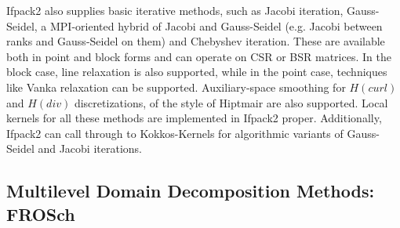 Ifpack2 also supplies basic iterative methods, such as Jacobi
iteration, Gauss-Seidel, a MPI-oriented hybrid of Jacobi and
Gauss-Seidel (e.g. Jacobi between ranks and Gauss-Seidel on them) and
Chebyshev iteration.  These are available both in point and block
forms and can operate on CSR or BSR matrices.  In the block case,
line relaxation is also supported, while in the point case, techniques
like Vanka relaxation \cite{Vanka1986} can be supported.  Auxiliary-space
smoothing for $H(curl)$ and $H(div)$ discretizations, of the style of
Hiptmair \cite{Hiptmair1997} are also supported.
Local kernels for all these methods are
implemented in Ifpack2 proper.  Additionally, Ifpack2 can call through
to Kokkos-Kernels for algorithmic variants of Gauss-Seidel and Jacobi iterations.

\subsection{Multilevel Domain Decomposition Methods: FROSch}
\label{ssec:frosch}

